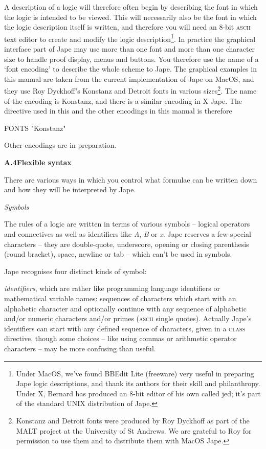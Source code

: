 \documentclass[11pt]{book}
\newcommand{\tab}{\hspace{5mm}}
\begin{document}
A description of a logic will therefore often begin by describing the font in which the logic is intended to be viewed. This will necessarily also be the font in which the logic description itself is written, and therefore you will need an 8-bit \textsc{ascii} text editor to create and modify the logic description\footnote{Under MacOS, we've found BBEdit Lite (freeware) very useful in preparing Jape logic descriptions, and thank its authors for their skill and philanthropy. Under X, Bernard has produced an 8-bit editor of his own called jed; it's part of the standard UNIX distribution of Jape.}. In practice the graphical interface part of Jape may use more than one font and more than one character size to handle proof display, menus and buttons. You therefore use the name of a `font encoding' to describe the whole scheme to Jape. The graphical examples in this manual are taken from the current implementation of Jape on MacOS, and they use Roy Dyckhoff's Konstanz and Detroit fonts in various sizes\footnote{Konstanz and Detroit fonts were produced by Roy Dyckhoff as part of the MALT project at the University of St Andrews. We are grateful to Roy for permission to use them and to distribute them with MacOS Jape.}. The name of the encoding is Konstanz, and there is a similar encoding in X Jape. The directive used in this and the other encodings in this manual is therefore

FONTS "Konstanz"


Other encodings are in preparation.


\textbf{{\large A.4\tab Flexible syntax}}


There are various ways in which you control what formulae can be written down and how they will be interpreted by Jape.


\textit{Symbols}


The rules of a logic are written in terms of various symbols -- logical operators and connectives as well as identifiers like \textit{A}, \textit{B} or \textit{x}. Jape reserves a few special characters -- they are double-quote, underscore, opening or closing parenthesis (round bracket), space, newline or tab -- which can't be used in symbols.


Jape recognises four distinct kinds of symbol:


{\textbullet}\tab \textit{identifiers}, which are rather like programming language identifiers or mathematical variable names: sequences of characters which start with an alphabetic character and optionally continue with any sequence of alphabetic and/or numeric characters and/or primes (\textsc{ascii} single quotes). Actually Jape's identifiers can start with any defined sequence of characters, given in a \textsc{class} directive, though some choices -- like using commas or arithmetic operator characters -- may be more confusing than useful.
\end{document}

